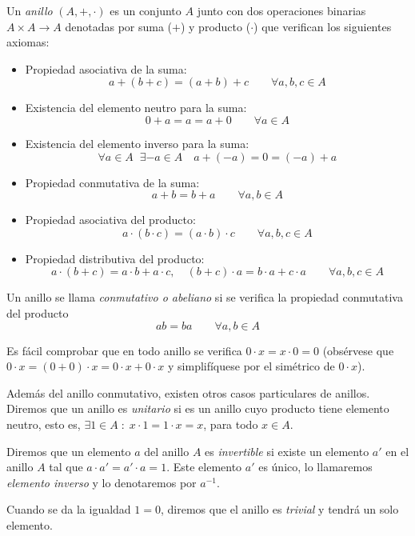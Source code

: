 \begin{definition}
    Un \emph{anillo} $(A, +, \cdot )$ es un conjunto $A$ junto con dos operaciones binarias $A \times A \rightarrow A$ denotadas por suma ($+$) y producto ($\cdot$) que verifican los siguientes axiomas:

    \begin{itemize}
        \item Propiedad asociativa de la suma: 
        $$  a + (b + c) = (a + b) + c \qquad \forall a,b,c \in A$$
        \item Existencia del elemento neutro para la suma:
        $$ 0 + a = a = a + 0 \qquad \forall a \in A$$
        \item Existencia del elemento inverso para la suma:
        $$ \forall a \in A \; \; \exists -a \in A \quad a + (-a) = 0 = (-a) + a $$
        \item Propiedad conmutativa de la suma:
        $$ a + b = b + a \qquad \forall a,b \in A $$
        \item Propiedad asociativa del producto:
        $$ a \cdot (b \cdot c) = (a \cdot b) \cdot c \qquad \forall a,b,c \in A $$
        \item Propiedad distributiva del producto:
        $$ a \cdot (b + c) = a \cdot b + a \cdot c, \quad (b + c) \cdot a = b \cdot a + c \cdot a \qquad \forall a,b,c \in A $$
    \end{itemize}

    Un anillo se llama \emph{conmutativo o abeliano} si se verifica la propiedad conmutativa del producto 
    \[ 
        ab = ba \qquad \forall a,b \in A 
    \]
\end{definition}

Es fácil comprobar que en todo anillo se verifica $0 \cdot x = x \cdot 0 = 0$ (obsérvese que $0 \cdot x = (0 + 0) \cdot x = 0 \cdot x + 0 \cdot x$ y simplifíquese por el simétrico de $0 \cdot x$).

Además del anillo conmutativo, existen otros casos particulares de anillos. Diremos que un anillo es \emph{unitario} si es un anillo cuyo producto tiene elemento neutro, esto es, $\exists 1 \in A \; : \; x \cdot 1 = 1 \cdot x = x$, para todo $x \in A$.

Diremos que un elemento $a$ del anillo $A$ es \emph{invertible} si existe un elemento $a'$ en el anillo $A$ tal que $a \cdot a' = a' \cdot a = 1$. Este elemento $a'$ es único, lo llamaremos \emph{elemento inverso} y lo denotaremos por $a^{-1}$.

Cuando se da la igualdad $1 = 0$, diremos que el anillo es \emph{trivial} y tendrá un solo elemento.

